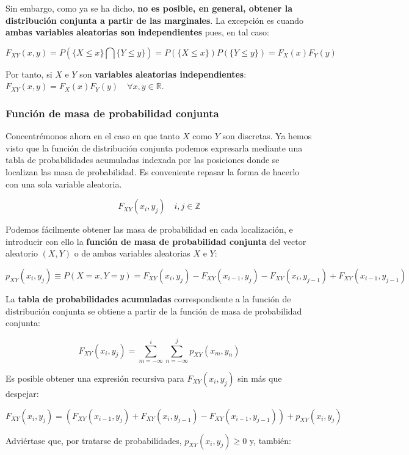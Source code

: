 \documentclass[11pt]{article}
\begin{document}
Sin embargo, como ya se ha dicho, \textbf{no es posible, en general,
obtener la distribución conjunta a partir de las marginales}. La
excepción es cuando \textbf{ambas variables aleatorias son
independientes} pues, en tal caso:

\[F_{XY}(x,y) = P\left(\{X \leq x\} \bigcap \{Y \leq y\}\right)=P(\{X \leq x\})P(\{Y \leq y\})= F_X(x)F_Y(y)\]

Por tanto, si \(X\) e \(Y\) son \textbf{variables aleatorias
independientes}:
\(F_{XY}(x,y) = F_X(x)F_Y(y) \quad \forall x,y \in \mathbb{R}\).

    \hypertarget{funciuxf3n-de-masa-de-probabilidad-conjunta}{%
\subsubsection{Función de masa de probabilidad
conjunta}\label{funciuxf3n-de-masa-de-probabilidad-conjunta}}

Concentrémonos ahora en el caso en que tanto \(X\) como \(Y\) son
discretas. Ya hemos visto que la función de distribución conjunta
podemos expresarla mediante una tabla de probabilidades acumuladas
indexada por las posiciones donde se localizan las masa de probabilidad.
Es conveniente repasar la forma de hacerlo con una sola variable
aleatoria.

\[F_{XY}(x_i,y_j) \quad i,j \in \mathbb{Z}\]

Podemos fácilmente obtener las masa de probabilidad en cada
localización, e introducir con ello la \textbf{función de masa de
probabilidad conjunta} del vector aleatorio \((X,Y)\) o de ambas
variables aleatorias \(X\) e \(Y\):

\[p_{XY}(x_i, y_j) \equiv P(X=x, Y=y) = F_{XY}(x_i, y_j) - F_{XY}(x_{i-1}, y_j) -  F_{XY}(x_i, y_{j-1}) + F_{XY}(x_{i-1}, y_{j-1})\]

    La \textbf{tabla de probabilidades acumuladas} correspondiente a la
función de distribución conjunta se obtiene a partir de la función de
masa de probabilidad conjunta:

\[F_{XY}(x_i, y_j) = \sum_{m=-\infty}^i\sum_{n=-\infty}^j p_{XY}(x_m, y_n)\]

Es posible obtener una expresión recursiva para \(F_{XY}(x_i,y_j)\) sin
más que despejar:

\[F_{XY}(x_i, y_j) = \left( F_{XY}(x_{i-1}, y_j) +  F_{XY}(x_i, y_{j-1}) - F_{XY}(x_{i-1}, y_{j-1})\right) + p_{XY}(x_i, y_j) \]

Adviértase que, por tratarse de probabilidades,
\(p_{XY}(x_i, y_j) \geq 0\) y, también:
\end{document}
